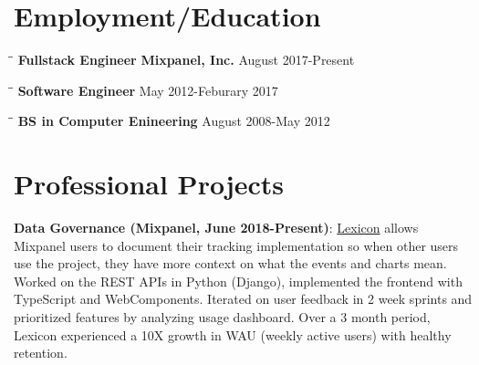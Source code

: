 \documentclass{res}
\begin{document}
 
\thispagestyle{empty} %
\address{\url{https://github.com/ksiondag}\\
ksiondag846@gmail.com\\
(520) 329-5081\\
Seattle, WA}


\begin{resume}
   
\section{Employment/Education} 
\vspace{-0.1in} 
  \begin{tabbing}
    \hspace{2.2in}\= \hspace{2.2in}\= \kill
    {\bf Fullstack Engineer} \> {\bf Mixpanel, Inc.}     \>August 2017-Present
  \end{tabbing}\vspace{-5pt}

  \vspace{-20pt}\begin{tabbing}
    \hspace{2.2in}\= \hspace{2.2in}\= \kill
    {\bf Software Engineer}  \> May 2012-Feburary 2017
  \end{tabbing}\vspace{-5pt}

  \vspace{-20pt}\begin{tabbing}
    \hspace{2.2in}\= \hspace{2.2in}\= \kill
    {\bf BS in Computer Enineering}  \> August 2008-May 2012\\
  \end{tabbing}\vspace{-5pt}


\section{Professional Projects}
  {\bf Data Governance (Mixpanel, June 2018-Present)}:
  \href{https://help.mixpanel.com/hc/en-us/articles/360001307806-Lexicon-Overview}{Lexicon} allows Mixpanel 
  users to document their tracking implementation so when other users use the project, they have more
  context on what the events and charts mean. Worked on the REST APIs in Python (Django), implemented the
  frontend with TypeScript and WebComponents. Iterated on user feedback in 2 week sprints and prioritized
  features by analyzing usage dashboard. Over a 3 month period, Lexicon experienced a 10X growth in WAU
  (weekly active users) with healthy retention.


\end{resume}
\end{document}
